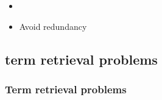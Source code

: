 \documentclass[ 
xcolor={usenames,dvipsnames,svgnames,tablem} 
,handout
]{beamer}
\begin{document}
%

%

%

\begin{frame}

\begin{exampleblock}{}
\begin{itemize}
\item 
\item Avoid redundancy
\end{itemize}
\end{exampleblock}{}
\end{frame}

\begin{frame}

\end{frame}

\begin{frame}

\end{frame}


\subsection{term retrieval problems}
\begin{frame}
\frametitle{Term retrieval problems}

\end{frame}


%
%
\end{document}
